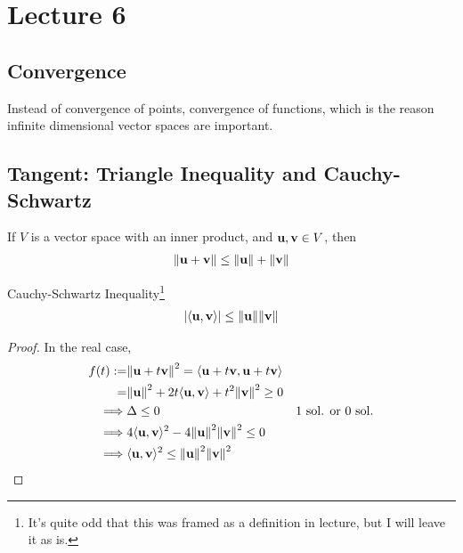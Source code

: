 \section{Lecture 6}
\subsection{Convergence}
Instead of convergence of points, convergence of functions, which is the reason infinite dimensional vector spaces are important.
\subsection{Tangent: Triangle Inequality and Cauchy-Schwartz}
\begin{definition}
If $V$ is a vector space with an inner product, and $\vb{u}, \vb{v} \in V$, then
\begin{align}
    \norm{\vb{u} + \vb{v}} \le \norm{\vb{u}} + \norm{\vb{v}}
\end{align}
\end{definition}
\begin{definition}
    Cauchy-Schwartz Inequality\footnote{It's quite odd that this was framed as a definition in lecture, but I will leave it as is.}
    \begin{align}
        \abs{\langle \vb{u}, \vb{v} \rangle} \le \norm{\vb{u}}\norm{\vb{v}}
    \end{align}
    \begin{proof}
        In the real case,
        \begin{align}
            f(t) :=& \norm{\vb{u} + t\vb{v}}^2 = \langle \vb{u} + t\vb{v}, \vb{u} + t\vb{v} \rangle\\
            =& \norm{\vb{u}}^2 + 2t \langle \vb{u}, \vb{v} \rangle + t^2 \norm{\vb{v}}^2 \ge 0\\
            \implies & \text{$\Delta \le 0$} & \text{1 sol. or 0 sol.}\\
            \implies & 4\langle \vb{u}, \vb{v} \rangle ^2 - 4\norm{\vb{u}}^2\norm{\vb{v}}^2 \le 0\\
            \implies & \langle \vb{u}, \vb{v} \rangle ^2 \le \norm{\vb{u}}^2\norm{\vb{v}}^2
        \end{align}
    \end{proof}
\end{definition}

